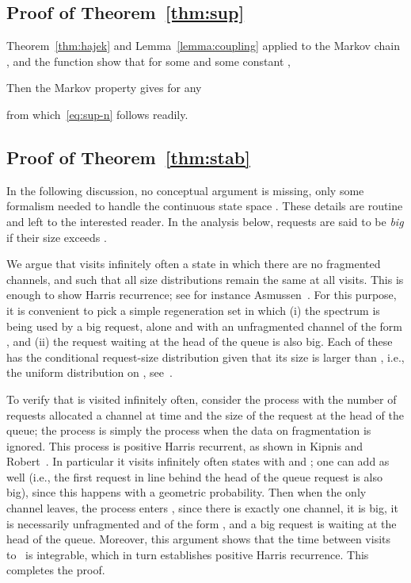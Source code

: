 \documentclass{amsart}
\begin{document}
\subsection*{Proof of Theorem~\ref{thm:sup}}
Theorem~\ref{thm:hajek} and Lemma~\ref{lemma:coupling} applied to
the Markov chain ,  and the function
 show that for some  and some constant ,

Then the Markov property gives for any 

from which~\eqref{eq:sup-n} follows readily.



\subsection*{Proof of Theorem~\ref{thm:stab}}  In the following
discussion, no conceptual argument is missing, only some formalism
needed to handle the continuous state space . These details
are routine and left to the interested reader. In the analysis
below, requests are said to be {\em big} if their size exceeds
.

We argue that  visits infinitely often a state in which
there are no fragmented channels, and such that all size
distributions remain the same at all visits. This is enough to show
Harris recurrence; see for instance Asmussen~\cite{Asmussen87:0}.
For this purpose, it is convenient to pick a simple regeneration set
 in which (i) the spectrum is being used by a big
request, alone and with an unfragmented channel of the form ,
and (ii) the request   waiting at the head of the queue is also
big. Each of these has the conditional request-size distribution
given that its size is larger than , i.e., the uniform
distribution on , see~\cite{KipnisR1990}.

To verify that  is visited infinitely often, consider the process
 with  the number of requests allocated a
channel at time  and  the size of the request at the head
of the queue; the process  is simply the process
 when the data on fragmentation is ignored. This process is
positive Harris recurrent, as shown in Kipnis and
Robert~\cite{KipnisR1990}. In particular it visits infinitely
often states with  and ; one can add  as well (i.e., the first request in line behind the head of the queue request is also big), since
this happens with a geometric probability. Then when the only
channel leaves, the process  enters , since there is
exactly one channel, it is big, it is necessarily
unfragmented and of the form , and a big request is waiting
at the head of the queue. Moreover, this argument shows that the
time between visits to~ is integrable, which in turn establishes
positive Harris recurrence. This completes the proof.
\end{document}
